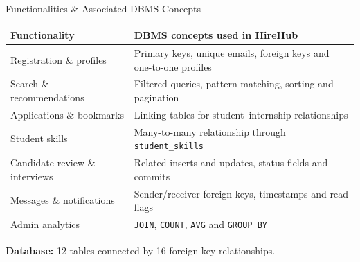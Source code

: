 \documentclass[aspectratio=169,11pt]{beamer}
\begin{document}
\begin{frame}{Functionalities \& Associated DBMS Concepts}
  \small
  \renewcommand{\arraystretch}{1.25}
  \begin{tabularx}{\textwidth}{|L{.29\textwidth}|Y|}
    \hline
    \textbf{Functionality} & \textbf{DBMS concepts used in HireHub}\\
    \hline
    Registration \& profiles & Primary keys, unique emails, foreign keys and one-to-one profiles\\
    \hline
    Search \& recommendations & Filtered queries, pattern matching, sorting and pagination\\
    \hline
    Applications \& bookmarks & Linking tables for student--internship relationships\\
    \hline
    Student skills & Many-to-many relationship through \texttt{student\_skills}\\
    \hline
    Candidate review \& interviews & Related inserts and updates, status fields and commits\\
    \hline
    Messages \& notifications & Sender/receiver foreign keys, timestamps and read flags\\
    \hline
    Admin analytics & \texttt{JOIN}, \texttt{COUNT}, \texttt{AVG} and \texttt{GROUP BY}\\
    \hline
  \end{tabularx}\par
  \par\vspace{3mm}
  \textbf{Database:} 12 tables connected by 16 foreign-key relationships.
\end{frame}
\end{document}
